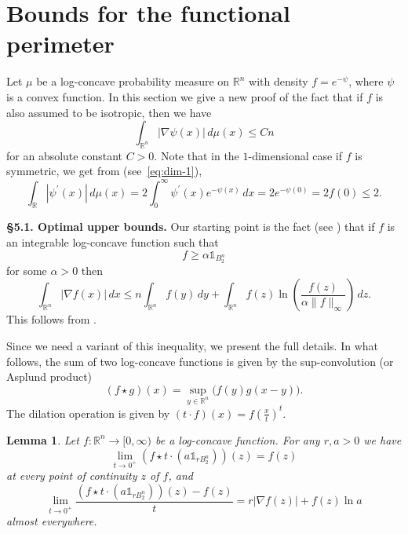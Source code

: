\documentclass[11pt,leqno]{article}
\newtheorem{lemma}[theorem]{Lemma}
\theoremstyle{definition}
\theoremstyle{remark}
\numberwithin{equation}{section}
\newcommand{\ls}{\leqslant}
\newcommand{\gr}{\geqslant}
\newcommand{\1}{\textbf{1}}
\begin{document}
\section{Bounds for the functional perimeter}\label{section:5}


Let $\mu $ be a log-concave probability measure on $\mathbb{R}^n$ with density $f=e^{-\psi}$, where $\psi$ is a convex function.
In this section we give a new proof of the fact that if $f$ is also assumed to be isotropic, then we have
\begin{equation}\label{eq:gradient-1}\int_{\mathbb{R}^n}|\nabla \psi(x)|\,d\mu(x)\ls Cn\end{equation}
for an absolute constant $C>0$. Note that in the $1$-dimensional case if $f$ is symmetric, we get from \cite{Fradelizi-1997}(see~\eqref{eq:dim-1}),
$$\int_{\mathbb{R}} |\psi^{\prime}(x)|\,d\mu(x) = 2 \int_0^{\infty} \psi^{\prime}(x) e^{-\psi(x)}\,dx = 2 e^{-\psi(0)}=2f(0) \ls 2.$$

\bigskip 

\noindent \textbf{\S 5.1. Optimal upper bounds.} Our starting point is the fact (see \cite[Equation~4]{Alves-Gonzalez-Villa-2023})
that if $f$ is an integrable log-concave function such that
\begin{equation}\label{eq:condition}f\gr \alpha\mathds{1}_{B_2^n}\end{equation}
for some $\alpha>0$ then
\begin{equation}\label{eq:very-useful}\int_{\mathbb{R}^n}|\nabla f(x)|\,dx\ls n\int_{\mathbb{R}^n}f(y)\,dy+\int_{\mathbb{R}^n}f(z)\ln\left(\frac{f(z)}{\alpha\|f\|_{\infty}}\right)\,dz.\end{equation}
This follows from \cite[Lemma~4.3]{Alonso-Gonzalez-Jimenez-Villa-2018}.

Since we need a variant of this inequality, we present the full details. In what follows, the sum of two log-concave
functions is given by the sup-convolution (or Asplund product)
$$(f\star g)(x)=\sup_{y\in\mathbb{R}^{n}}\big(f(y)g(x-y)\big).$$
The dilation operation is given by $(t\cdot f)(x)=f\left(\frac{x}{t}\right)^t$.

\begin{lemma}\label{lem:alonso}Let $f:\mathbb{R}^n\to [0,\infty)$ be a log-concave function. For any $r,a>0$ we have
$$\lim_{t\to 0^+}(f\star t\cdot (a\mathds{1}_{rB_2^n}))(z)=f(z)$$
at every point of continuity $z$ of $f$, and
$$\lim_{t\to 0^+}\frac{(f\star t\cdot (a\mathds{1}_{rB_2^n}))(z)-f(z)}{t}=r|\nabla f(z)|+f(z)\ln a$$
almost everywhere.\end{lemma}
\end{document}
